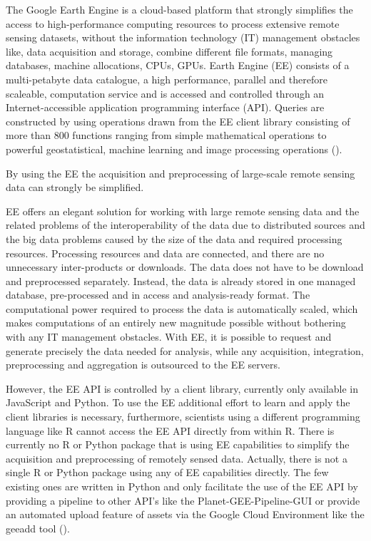 The Google Earth Engine is a cloud-based platform that strongly simplifies the access to high-performance computing resources to process extensive remote sensing datasets, without the information technology (IT) management obstacles like, data acquisition and storage, combine different file formats, managing databases, machine allocations, CPUs, GPUs. 
Earth Engine (EE) consists of a multi-petabyte data catalogue, a high performance, parallel and therefore scaleable, computation service and is accessed and controlled through an Internet-accessible application programming interface (API). Queries are constructed by using operations drawn from the EE client library consisting of more than 800 functions ranging from simple mathematical operations to powerful geostatistical, machine learning and image processing operations (\cite{gorelick2017google}).

By using the EE the acquisition and preprocessing of large-scale remote sensing data can strongly be simplified.

EE offers an elegant solution for working with large remote sensing data and the related problems of the interoperability of the data due to distributed sources and the big data problems caused by the size of the data and required processing resources. 
Processing resources and data are connected, and there are no unnecessary inter-products or downloads. 
The data does not have to be download and preprocessed separately. Instead, the data is already stored in one managed database, pre-processed and in access and analysis-ready format. 
The computational power required to process the data is automatically scaled, which makes computations of an entirely new magnitude possible without bothering with any IT management obstacles.
With EE, it is possible to request and generate precisely the data needed for analysis, while any acquisition, integration, preprocessing and aggregation is outsourced to the EE servers. 

However, the EE API is controlled by a client library, currently only available in JavaScript and Python. To use the EE additional effort to learn and apply the client libraries is necessary, furthermore, scientists using a different programming language like R cannot access the EE API directly from within R.
There is currently no R or Python package that is using EE capabilities to simplify the acquisition and preprocessing of remotely sensed data. Actually, there is not a single R or Python package using any of EE capabilities directly. The few existing ones are written in Python and only facilitate the use of the EE API by providing a pipeline to other API's like the Planet-GEE-Pipeline-GUI or provide an automated upload feature of assets via the Google Cloud Environment like the geeadd tool (\cite{roy2017google}).

